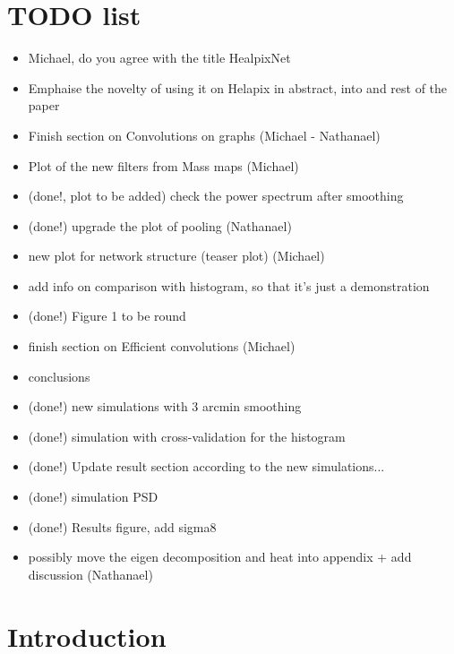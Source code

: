 \documentclass[final,twocolumn,3p,times,authoryear]{elsarticle}
\newcommand{\assign}[1]{{\color[rgb]{.8,.5,.8}{Assigned: #1 }}}
\newcommand{\1}{\b{1}}              %
\newcommand{\0}{\b{0}}              %
\begin{document}
\section{TODO list}
\begin{itemize}
    \item Michael, do you agree with the title HealpixNet
    \item Emphaise the novelty of using it on Helapix in abstract, into and rest of the paper
    \item Finish section on Convolutions on graphs (Michael - Nathanael)
    \item Plot of the new filters from Mass maps (Michael)
    \item (done!, plot to be added) check the power spectrum after smoothing
    \item (done!) upgrade the plot of pooling (Nathanael)
    \item new plot for network structure (teaser plot) (Michael)
    \item add info on comparison with histogram, so that it's just a demonstration
    \item (done!) Figure 1 to be round
    \item finish section on Efficient convolutions (Michael)
    \item conclusions
    \item (done!) new simulations with 3 arcmin smoothing
    \item (done!) simulation with cross-validation for the histogram
    \item (done!) Update result section according to the new simulations...
    \item (done!) simulation PSD
    \item (done!) Results figure, add sigma8
    \item possibly move the eigen decomposition and heat into appendix + add discussion (Nathanael)
\end{itemize}

\section{Introduction}
\label{sec:intro}

\assign{Tomek}
\end{document}
